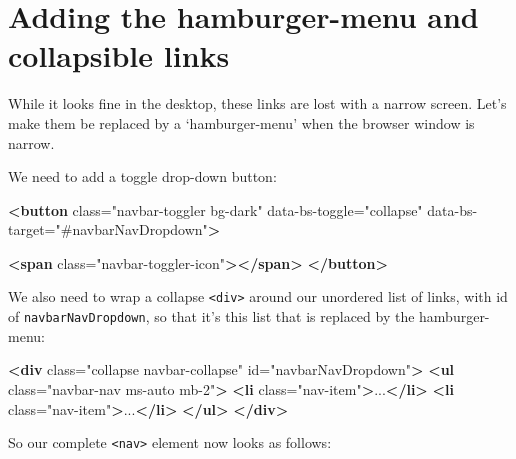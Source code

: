 \documentclass[a4paperpaper,openright]{book}
\newenvironment{Shaded}{}{}
\newcommand{\KeywordTok}[1]{\textcolor[rgb]{0.00,0.44,0.13}{\textbf{#1}}}
\newcommand{\NormalTok}[1]{#1}
\newcommand{\OtherTok}[1]{\textcolor[rgb]{0.00,0.44,0.13}{#1}}
\newcommand{\StringTok}[1]{\textcolor[rgb]{0.25,0.44,0.63}{#1}}
\begin{document}
\hypertarget{adding-the-hamburger-menu-and-collapsible-links}{%
\section{Adding the hamburger-menu and collapsible
links}\label{adding-the-hamburger-menu-and-collapsible-links}}

While it looks fine in the desktop, these links are lost with a narrow
screen. Let's make them be replaced by a `hamburger-menu' when the
browser window is narrow.

We need to add a toggle drop-down button:

\begin{Shaded}
\begin{Highlighting}[]
    \KeywordTok{<button}\OtherTok{ class=}\StringTok{"navbar-toggler bg-dark"}\OtherTok{ data-bs-toggle=}\StringTok{"collapse"}
\OtherTok{        data-bs-target=}\StringTok{"#navbarNavDropdown"}\KeywordTok{>}

        \KeywordTok{<span}\OtherTok{ class=}\StringTok{"navbar-toggler-icon"}\KeywordTok{></span>}
    \KeywordTok{</button>}
\end{Highlighting}
\end{Shaded}

We also need to wrap a collapse \texttt{\textless{}div\textgreater{}}
around our unordered list of links, with id of
\texttt{navbarNavDropdown}, so that it's this list that is replaced by
the hamburger-menu:

\begin{Shaded}
\begin{Highlighting}[]
    \KeywordTok{<div}\OtherTok{ class=}\StringTok{"collapse navbar-collapse"}\OtherTok{ id=}\StringTok{"navbarNavDropdown"}\KeywordTok{>}
        \KeywordTok{<ul}\OtherTok{ class=}\StringTok{"navbar-nav ms-auto mb-2"}\KeywordTok{>}
            \KeywordTok{<li}\OtherTok{ class=}\StringTok{"nav-item"}\KeywordTok{>}\NormalTok{...}\KeywordTok{</li>}
            \KeywordTok{<li}\OtherTok{ class=}\StringTok{"nav-item"}\KeywordTok{>}\NormalTok{...}\KeywordTok{</li>}
        \KeywordTok{</ul>}
    \KeywordTok{</div>}
\end{Highlighting}
\end{Shaded}

So our complete \texttt{\textless{}nav\textgreater{}} element now looks
as follows:
\end{document}
